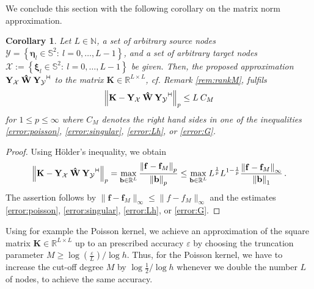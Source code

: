\documentclass[11pt,a4paper,twoside,bibtotoc]{scrartcl}
\theoremstyle{plain}
\newtheorem{corollary}[theorem]{Corollary}
\theoremstyle{definition}
\theoremstyle{remark}
\newcommand{\N}{\ensuremath{\mathbb{N}}}
\newcommand{\R}{\ensuremath{\mathbb{R}}}
\newcommand{\adj}{{\vdash \hspace*{-1.72mm} \dashv}}
\numberwithin{equation}{section}
\numberwithin{table}{section}
\numberwithin{figure}{section}
\begin{document}
We conclude this section with the following corollary on the matrix norm
approximation.
\begin{corollary}
  \label{cor:rankapprox}
  Let $L \in \N$, a set of arbitrary source nodes $\mathcal{Y} =
  \left\{\mathbf{\eta}_{l} \in \mathbb{S}^2:\ l = 0,\ldots,L-1\right\}$, and a set of
  arbitrary target nodes $\mathcal{X} := \left\{\mathbf{\xi}_{l} \in
  \mathbb{S}^2:\ l=0,\ldots,L-1\right\}$ be given.
  Then, the proposed approximation $\mathbf{Y_{\mathcal{X}}} \: \mathbf{\hat W} \:
  \mathbf{Y_{\mathcal{Y}}}^{\adj}$ to the matrix $\mathbf{K}\in
  \R^{L\times L}$, cf. Remark
  \ref{rem:rankM}, fulfils
  \begin{equation*}
    \left\| \mathbf{K} - \mathbf{Y_{\mathcal{X}}} \: \mathbf{\hat W} \:
      \mathbf{Y_{\mathcal{Y}}}^{\adj} \right\|_p
    \le L \: C_M
  \end{equation*}
  for $1\le p \le \infty$ where $C_M$ denotes the right hand sides in one of
  the inequalities \eqref{error:poisson}, \eqref{error:singular},
  \eqref{error:Lh}, or \eqref{error:G}. 
\end{corollary}
\begin{proof}
 Using H\"older's inequality, we obtain
 \[
 \left\| \mathbf{K} - \mathbf{Y_{\mathcal{X}}} \: \mathbf{\hat W} \:
   \mathbf{Y_{\mathcal{Y}}}^{\adj} \right\|_p
 = \max_{\mathbf{b}\in \R^L} \frac{\left\|\mathbf{f} -
     \mathbf{f}_{M}\right\|_{p}}{\left\|\mathbf{b}\right\|_p}
 \le \max_{\mathbf{b}\in \R^L} L^{\frac{1}{p}} L^{1-\frac{1}{p}} \frac{\left\|\mathbf{f}
     - \mathbf{f}_{M}\right\|_{\infty}}{\left\|\mathbf{b}\right\|_1}\,.
 \]
 The assertion follows by $\|\mathbf{f} - \mathbf{f}_{M}\|_{\infty} \le
  \|f-f_M\|_{\infty}$ and the estimates
  \eqref{error:poisson}, \eqref{error:singular}, \eqref{error:Lh}, or
  \eqref{error:G}.
\end{proof}

Using for example the Poisson kernel, we achieve an approximation of the square matrix
$\mathbf{K}\in\R^{L \times L}$ up to an prescribed accuracy $\varepsilon$ by
choosing the truncation parameter $M\ge \log(\frac{\varepsilon}{L}) /\log h$.
Thus, for the Poisson kernel, we have to increase the cut-off degree $M$ by
$\log\frac{1}{2} / \log h$ whenever we double the number $L$ of nodes, to achieve
the same accuracy.

\end{document}
